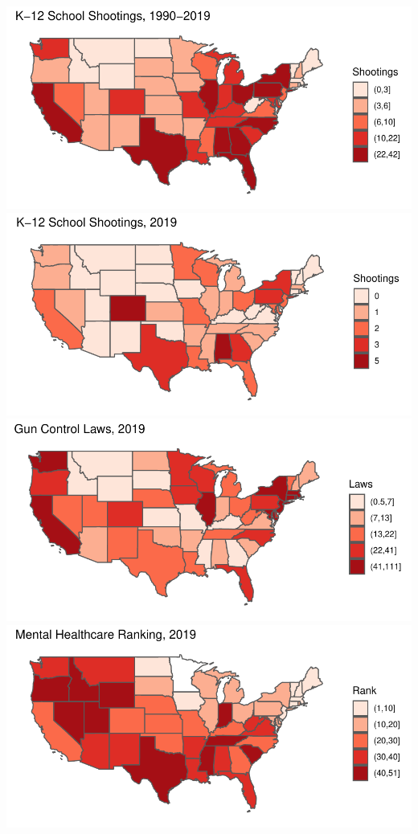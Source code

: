 \documentclass[
  12pt,
]{article}
\begin{document}
\includegraphics{JStevenRaquel_STATS295_Final_files/figure-latex/plot-areals-2019-1.pdf}
\includegraphics{JStevenRaquel_STATS295_Final_files/figure-latex/plot-areals-2019-2.pdf}
\includegraphics{JStevenRaquel_STATS295_Final_files/figure-latex/plot-areals-2019-3.pdf}
\includegraphics{JStevenRaquel_STATS295_Final_files/figure-latex/plot-areals-2019-4.pdf}
\end{document}
